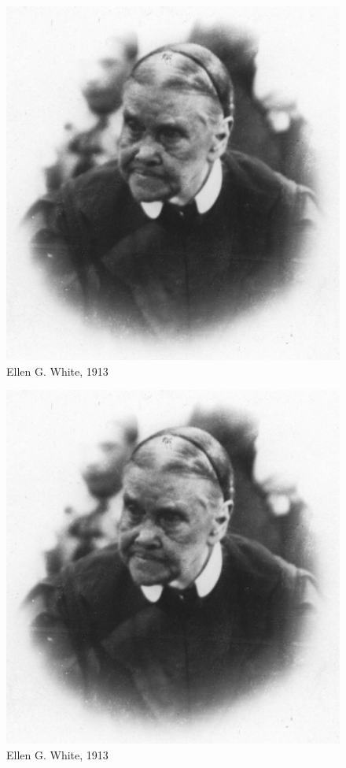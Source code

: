 \begin{figure}
    \centering
    \includegraphics[width=1\linewidth]{images/ellen-white-1913.jpg}
    \caption*{Ellen G. White, 1913}
    \label{fig:e-white-1913}
\end{figure}


\begin{figure}
    \centering
    \includegraphics[width=1\linewidth]{images/ellen-white-1913.jpg}
    \caption*{Ellen G. White, 1913}
    \label{fig:e-white-1913}
\end{figure}


